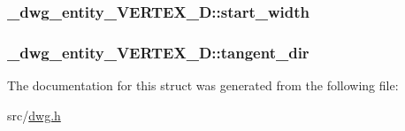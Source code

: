\hypertarget{struct__dwg__entity__VERTEX__2D_a5b903847c861d18dfc8b6bbdcac817af}{
\subsubsection[{start\-\_\-width}]{ {\bf \-\_\-dwg\-\_\-entity\-\_\-\-V\-E\-R\-T\-E\-X\-\_\-D\-::start\-\_\-width}}}\label{struct__dwg__entity__VERTEX__2D_a5b903847c861d18dfc8b6bbdcac817af}
\hypertarget{struct__dwg__entity__VERTEX__2D_a2ef36a46c0c80c70974a6e2cb6ee5830}{
\subsubsection[{tangent\-\_\-dir}]{ {\bf \-\_\-dwg\-\_\-entity\-\_\-\-V\-E\-R\-T\-E\-X\-\_\-D\-::tangent\-\_\-dir}}}\label{struct__dwg__entity__VERTEX__2D_a2ef36a46c0c80c70974a6e2cb6ee5830}


\-The documentation for this struct was generated from the following file\-:\begin{DoxyCompactItemize}
\item 
src/\hyperlink{dwg_8h}{dwg.\-h}\end{DoxyCompactItemize}
